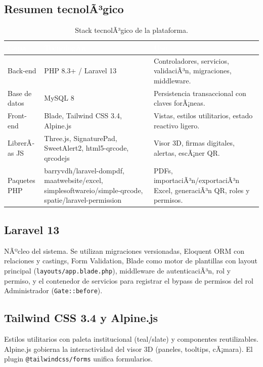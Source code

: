 ﻿\documentclass[a4paper, 12pt]{article}
\begin{document}
\subsection{Resumen tecnolÃ³gico}
\begin{table}[H]
\centering
\begin{tabularx}{\textwidth}{|X|X|X|}
\hline
\rowcolor{ucsblue} \textcolor{white}{\textbf{Capa}} & \textcolor{white}{\textbf{TecnologÃ­a}} & \textcolor{white}{\textbf{Uso}} \\ \hline
Back-end & PHP 8.3+ / Laravel 13 & Controladores, servicios, validaciÃ³n, migraciones, middleware. \\ \hline
Base de datos & MySQL 8 & Persistencia transaccional con claves forÃ¡neas. \\ \hline
Front-end & Blade, Tailwind CSS 3.4, Alpine.js & Vistas, estilos utilitarios, estado reactivo ligero. \\ \hline
LibrerÃ­as JS & Three.js, SignaturePad, SweetAlert2, html5-qrcode, qrcodejs & Visor 3D, firmas digitales, alertas, escÃ¡ner QR. \\ \hline
Paquetes PHP & barryvdh/laravel-dompdf, maatwebsite/excel, simplesoftwareio/simple-qrcode, spatie/laravel-permission & PDFs, importaciÃ³n/exportaciÃ³n Excel, generaciÃ³n QR, roles y permisos. \\ \hline
\end{tabularx}
\caption{Stack tecnolÃ³gico de la plataforma.}
\end{table}

\subsection{Laravel 13}
NÃºcleo del sistema. Se utilizan migraciones versionadas, Eloquent ORM con relaciones y castings, Form Validation, Blade como motor de plantillas con layout principal (\texttt{layouts/app.blade.php}), middleware de autenticaciÃ³n, rol y permiso, y el contenedor de servicios para registrar el bypass de permisos del rol Administrador (\texttt{Gate::before}).

\subsection{Tailwind CSS 3.4 y Alpine.js}
Estilos utilitarios con paleta institucional (teal/slate) y componentes reutilizables. Alpine.js gobierna la interactividad del visor 3D (paneles, tooltips, cÃ¡mara). El plugin \texttt{@tailwindcss/forms} unifica formularios.
\end{document}
